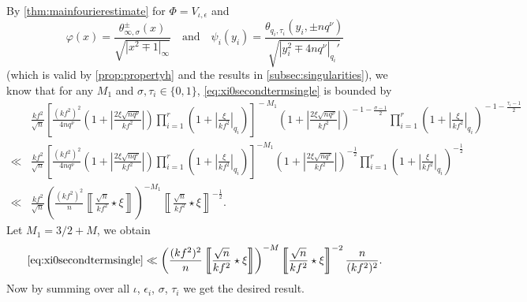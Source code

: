 \documentclass[10pt,oneside,reqno]{amsart}
\makeatletter
\theoremstyle{THEOREM}
\theoremstyle{DEFINITION}
\theoremstyle{EXERCISE}
\numberwithin{equation}{section}
\renewenvironment{proof}[1][\proofname]{\par
  \vspace{-6pt}
  \pushQED{\qed}
  \normalfont \topsep6\p@\@plus6\p@\relax
  \trivlist
  \item[\hskip\labelsep\rmfamily\bfseries
    #1\@addpunct{:}]\ignorespaces
}{
  \popQED\endtrivlist\@endpefalse
  \vspace{-6pt}
}
\makeatother
\begin{document}
\begin{proof}
By \autoref{thm:mainfourierestimate} for $\Phi=V_{\iota,\epsilon}$ and
\[
\varphi(x)=\frac{\theta_{\infty,\sigma}^\pm(x)}{\sqrt{|x^2\mp 1|_\infty}}\quad\text{and}\quad \psi_i(y_i)=\frac{\theta_{q_i,\tau_i}(y_i,\pm nq^\nu)}{\sqrt{|y_i^2\mp 4nq^\nu|_{q_i}'}}
\]
(which is valid by \autoref{prop:propertyh} and the results in \autoref{subsec:singularities}), we know that for any $M_1$ and $\sigma,\tau_i\in \{0,1\}$, \eqref{eq:xi0secondtermsingle} is bounded by
\begin{align*}
&\frac{kf^2}{\sqrt{n}} \left[\frac{(kf^2)^2}{4nq^\nu}\!\left(1+\left|\frac{2\xi\sqrt{nq^\nu}}{kf^2}\right|\right) \prod_{i=1}^{r}\left(1+\left|\frac{\xi}{kf^2}\right|_{q_i}\!\right)\!\right]^{\!-M_1} \!\! \left(1+\left|\frac{2\xi\sqrt{nq^\nu}}{kf^2}\right|\right)^{\!\!-1-\frac{\sigma-1}{2}} \prod_{i=1}^{r}\left(\!1+\left|\frac{\xi}{kf^2}\right|_{q_i}\right)^{\!\!-1-\frac{\tau_i-1}{2}}\\
\ll& \frac{kf^2}{\sqrt{n}} \left[\frac{(kf^2)^2}{4nq^\nu}\left(1+\left|\frac{2\xi\sqrt{nq^\nu}}{kf^2}\right|\right) \prod_{i=1}^{r}\left(1+\left|\frac{\xi}{kf^2}\right|_{q_i}\right)\right]^{-M_1} \left(1+\left|\frac{2\xi\sqrt{nq^\nu}}{kf^2}\right|\right)^{-\frac12} \prod_{i=1}^{r}\left(1+\left|\frac{\xi}{kf^2}\right|_{q_i}\right)^{-\frac12}\\
\ll&  \frac{kf^2}{\sqrt{n}}\left(\frac{(kf^2)^2}{n}\left\llbracket\frac{\sqrt{n}}{kf^2}\star \xi\right\rrbracket\right)^{-M_1}\left\llbracket\frac{\sqrt{n}}{kf^2}\star \xi\right\rrbracket^{-\frac12}.
\end{align*}
Let $M_1=3/2+M$, we obtain
\[
\eqref{eq:xi0secondtermsingle}
\ll \left(\frac{(kf^2)^2}{n}\left\llbracket\frac{\sqrt{n}}{kf^2}\star \xi\right\rrbracket\right)^{-M} \left\llbracket\frac{\sqrt{n}}{kf^2}\star \xi\right\rrbracket^{-2}\frac{n}{(kf^2)^2}.
\]
Now by summing over all $\iota$, $\epsilon_i$, $\sigma$, $\tau_i$ we get the desired result.
\end{proof}
\end{document}
